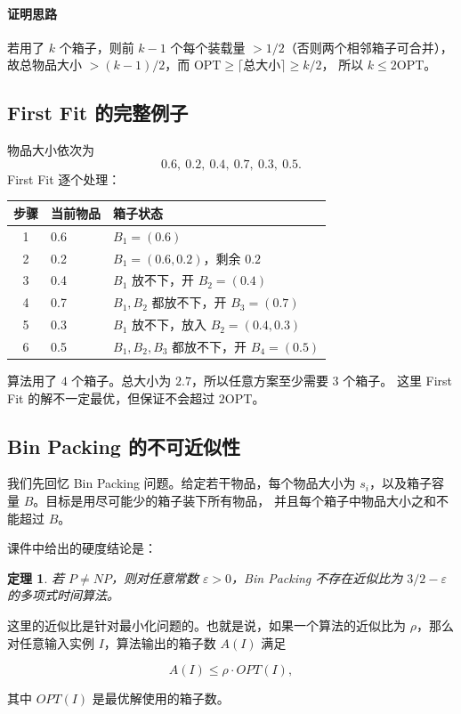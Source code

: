 \documentclass[UTF8,openany,12pt]{ctexbook}
\newtheorem{theorem}{定理}[chapter]
\theoremstyle{remark}
\newcommand{\proofidea}[1]{\paragraph{证明思路}#1}
\newcommand{\OPT}{\mathrm{OPT}}
\begin{document}
\proofidea{若用了 $k$ 个箱子，则前 $k-1$ 个每个装载量 $> 1/2$（否则两个相邻箱子可合并），
故总物品大小 $> (k-1)/2$，而 $\OPT \ge \lceil\text{总大小}\rceil \ge k/2$，
所以 $k \le 2\OPT$。}

\subsection{First Fit 的完整例子}

物品大小依次为
\[
  0.6,\ 0.2,\ 0.4,\ 0.7,\ 0.3,\ 0.5.
\]
First Fit 逐个处理：
\begin{center}
\begin{tabular}{c|l|l}
  \toprule
  步骤 & 当前物品 & 箱子状态\\
  \midrule
  1 & 0.6 & $B_1=(0.6)$\\
  2 & 0.2 & $B_1=(0.6,0.2)$，剩余 $0.2$\\
  3 & 0.4 & $B_1$ 放不下，开 $B_2=(0.4)$\\
  4 & 0.7 & $B_1,B_2$ 都放不下，开 $B_3=(0.7)$\\
  5 & 0.3 & $B_1$ 放不下，放入 $B_2=(0.4,0.3)$\\
  6 & 0.5 & $B_1,B_2,B_3$ 都放不下，开 $B_4=(0.5)$\\
  \bottomrule
\end{tabular}
\end{center}
算法用了 $4$ 个箱子。总大小为 $2.7$，所以任意方案至少需要 $3$ 个箱子。
这里 First Fit 的解不一定最优，但保证不会超过 $2\OPT$。

\subsection{Bin Packing 的不可近似性}

我们先回忆 Bin Packing 问题。给定若干物品，每个物品大小为
$s_i$，以及箱子容量 $B$。目标是用尽可能少的箱子装下所有物品，
并且每个箱子中物品大小之和不能超过 $B$。

课件中给出的硬度结论是：

\begin{theorem}
若 $P\ne NP$，则对任意常数 $\varepsilon>0$，Bin Packing
不存在近似比为 $3/2-\varepsilon$ 的多项式时间算法。
\end{theorem}

这里的近似比是针对最小化问题的。也就是说，如果一个算法的近似比为
$\rho$，那么对任意输入实例 $I$，算法输出的箱子数 $A(I)$ 满足

$$
A(I) \le \rho \cdot OPT(I),
$$

其中 $OPT(I)$ 是最优解使用的箱子数。
\end{document}
